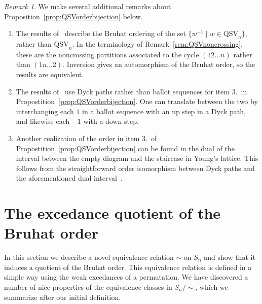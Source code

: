 \documentclass[12pt]{amsart}
\newcommand{\Lucas}[1]{\todo[size=\tiny,inline,color=green!5!red!30!yellow!80]{#1 \\ \hfill --- Lucas}}
\theoremstyle{definition}
\theoremstyle{remark}
\newtheorem{rem}[equation]{Remark}
\numberwithin{equation}{section}
\newcommand{\QSV}{\mathrm{QSV}}
\begin{document}
\begin{rem}
We make several additional remarks about Proposition~\ref{prop:QSVorderbijection} below.
\begin{enumerate}
\item The results of~\cite{GobetWilliams} describe the Bruhat ordering of the set $\{w^{-1} \;|\; w \in \QSV_{n}\}$, rather than $\QSV_{n}$.  
In the terminology of Remark~\ref{rem:QSVnoncrossing}, these are the noncrossing partitions associated to the cycle $(12\ldots n)$ rather than $(1n\ldots 2)$.  
Inversion gives an automorphism of the Bruhat order, so the results are equivalent.

\item The results of~\cite{GobetWilliams} use Dyck paths rather than ballot sequences for item 3.~in Propostition~\ref{prop:QSVorderbijection}.  
One can translate between the two by interchanging each $1$ in a ballot sequence with an up step in a Dyck path, and likewise each $-1$ with a down step.

\item Another realization of the order in item 3.~of Propostition~\ref{prop:QSVorderbijection} can be found in the dual of the interval between the empty diagram and the staircase in Young's lattice.  This follows from the straightforward order isomorphism between Dyck paths and the aforementioned dual interval~\cite[Solution 6.19 vv]{Stanley}.

\end{enumerate}
\end{rem}

\Lucas{I am here}

\section{The excedance quotient of the Bruhat order}
\label{sec:excedance}

In this section we describe a novel equivalence relation $\sim$ on $S_{n}$ and show that it induces a quotient of the Bruhat order.  
This equivalence relation is defined in a simple way using the weak excedances of a permutation.  
We have discovered a number of nice properties of the equivalence classes in $S_{n}/\!\sim$, which we summarize after our initial definition.

%
%
%
\end{document}
